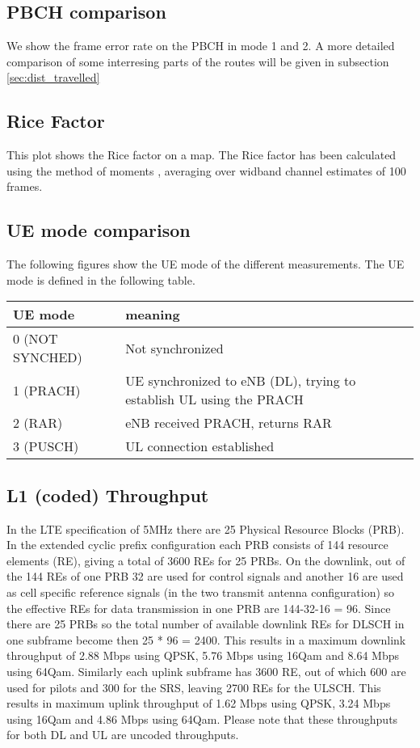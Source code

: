 \documentclass[a4paper,10pt]{article}
\begin{document}
\subsection{PBCH comparison}
We show the frame error rate on the PBCH in mode 1 and 2. A more detailed comparison of some interresing parts of the routes will be given in subsection \ref{sec:dist_travelled}

\subsection{Rice Factor}
This plot shows the Rice factor on a map. The Rice factor has been calculated using the method of moments \cite{Greenstein1999}, averaging over widband channel estimates of 100 frames.

\subsection{UE mode comparison}
The following figures show the UE mode of the different measurements. The UE mode is defined in the following table.

\begin{center}
\begin{tabular}{l|p{6cm}}
UE mode & meaning \\ 
\hline
0 (NOT SYNCHED) & Not synchronized \\ 
1 (PRACH) & UE synchronized to eNB (DL), trying to establish UL using the PRACH\\ 
2 (RAR) & eNB received PRACH, returns RAR \\ 
3 (PUSCH) & UL connection established
\end{tabular}
\end{center}


\subsection{L1 (coded) Throughput}

In the LTE specification of 5MHz there are 25 Physical Resource Blocks (PRB). In the extended cyclic prefix configuration each PRB consists of 144 resource elements (RE), giving a total of 3600 REs for 25 PRBs. On the downlink, out of the 144 REs of one PRB 32 are used for control signals and another 16 are used as cell specific reference signals (in the two transmit antenna configuration) so the effective REs for data transmission in one PRB are 144-32-16 = 96. Since there are 25 PRBs so the total number of available downlink REs for DLSCH in one subframe become then 25 * 96 = 2400. This results in a maximum downlink throughput of 2.88 Mbps using QPSK, 5.76 Mbps using 16Qam and 8.64 Mbps using 64Qam. Similarly each uplink subframe has 3600 RE, out of which 600 are used for pilots and 300 for the SRS, leaving 2700 REs for the ULSCH. This results in maximum uplink throughput of 1.62 Mbps using QPSK, 3.24 Mbps using 16Qam and 4.86 Mbps using 64Qam. Please note that these throughputs for both DL and UL are uncoded throughputs. 
\end{document}
